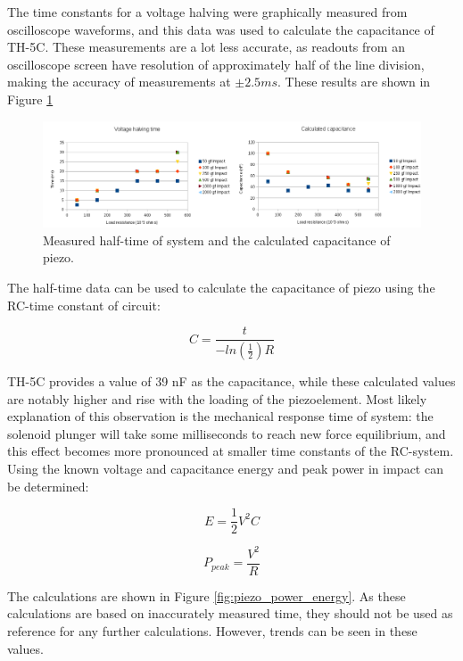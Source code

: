 The time constants for a voltage halving were graphically measured from oscilloscope waveforms, and this data was used to calculate the capacitance of TH-5C. These measurements are a lot less accurate, as readouts from an oscilloscope screen have resolution of approximately half of the line division, making the accuracy of measurements at $\pm 2.5 ms$. These results are shown in Figure \ref{fig:piezo_time_capacitance}

\begin{figure}[htb]
  \begin{center}
  \includegraphics[width=\columnwidth]{images/own_measurement/piezo_capacitance}
  \end{center}
  \caption{Measured half-time of system and the calculated capacitance of piezo.}
  \label{fig:piezo_time_capacitance}
\end{figure}

The half-time data can be used to calculate the capacitance of piezo using the RC-time constant of circuit:

\begin{equation}
  C=\frac{t}{-ln(\frac{1}{2})R} 
\end{equation}

TH-5C provides a value of 39 nF as the capacitance, while these calculated values are notably higher and rise with the loading of the piezoelement. Most likely explanation of this observation is the mechanical response time of system: the solenoid plunger will take some milliseconds to reach new force equilibrium, and this effect becomes more pronounced at smaller time constants of the RC-system. Using the known voltage and capacitance energy and peak power in impact can be determined:
 
\begin{equation}
   E = \frac{1}{2}V^2C
\end{equation}

\begin{equation}
   P_{peak} = \frac{V^2}{R}
\end{equation}
 
The calculations are shown in Figure \ref{fig:piezo_power_energy}. As these calculations are based on inaccurately measured time, they should not be used as reference for any further calculations. However, trends can be seen in these values. 
 

